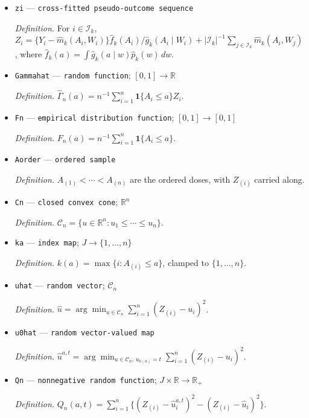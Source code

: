 \documentclass{article}
\begin{document}
\begin{itemize}
  \item \texttt{zi} --- \texttt{cross-\allowbreak{}fitted pseudo-\allowbreak{}outcome sequence}
  \par\smallskip\noindent\emph{Definition.} For \(i\in\mathcal I_{k}\), \(Z_i=\{Y_i-\widehat m_k(A_i,W_i)\}\widehat f_k(A_i)/\widehat g_k(A_i\mid W_i)+|\mathcal I_k|^{-1}\sum_{j\in\mathcal I_k}\widehat m_k(A_i,W_j)\), where \(\widehat f_k(a)=\int\widehat g_k(a\mid w)\widehat p_k(w)\,dw\).
  \item \texttt{Gammahat} --- \texttt{random function}; \([0,1]\to\mathbb R\)
  \par\smallskip\noindent\emph{Definition.} \(\widehat\Gamma_n(a)=n^{-1}\sum_{i=1}^{n}\mathbf 1\{A_i\le a\}Z_i\).
  \item \texttt{Fn} --- \texttt{empirical distribution function}; \([0,1]\to[0,1]\)
  \par\smallskip\noindent\emph{Definition.} \(F_n(a)=n^{-1}\sum_{i=1}^{n}\mathbf 1\{A_i\le a\}\).
  \item \texttt{Aorder} --- \texttt{ordered sample}
  \par\smallskip\noindent\emph{Definition.} \(A_{(1)}<\cdots<A_{(n)}\) are the ordered doses, with \(Z_{(i)}\) carried along.
  \item \texttt{Cn} --- \texttt{closed convex cone}; \(\mathbb R^{n}\)
  \par\smallskip\noindent\emph{Definition.} \(\mathcal C_n=\{u\in\mathbb R^n:u_1\le\cdots\le u_n\}\).
  \item \texttt{ka} --- \texttt{index map}; \(J\to\{1,\ldots,n\}\)
  \par\smallskip\noindent\emph{Definition.} \(k(a)=\max\{i:A_{(i)}\le a\}\), clamped to \(\{1,\ldots,n\}\).
  \item \texttt{uhat} --- \texttt{random vector}; \(\mathcal C_n\)
  \par\smallskip\noindent\emph{Definition.} \(\widehat u=\arg\min_{u\in\mathcal C_n}\sum_{i=1}^{n}(Z_{(i)}-u_i)^2\).
  \item \texttt{u0hat} --- \texttt{random vector-\allowbreak{}valued map}
  \par\smallskip\noindent\emph{Definition.} \(\widehat u^{a,t}=\arg\min_{u\in\mathcal C_n,\,u_{k(a)}=t}\sum_{i=1}^{n}(Z_{(i)}-u_i)^2\).
  \item \texttt{Qn} --- \texttt{nonnegative random function}; \(J\times\mathbb R\to\mathbb R_{+}\)
  \par\smallskip\noindent\emph{Definition.} \(Q_n(a,t)=\sum_{i=1}^{n}\{(Z_{(i)}-\widehat u^{a,t}_i)^2-(Z_{(i)}-\widehat u_i)^2\}\).

\end{itemize}
\end{document}
